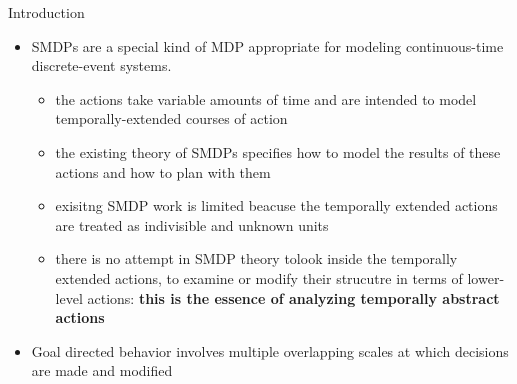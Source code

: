 \begin{frame}{Introduction}
    \begin{itemize}
        \item SMDPs are a special kind of MDP appropriate for modeling continuous-time discrete-event systems.
        \begin{itemize}
            \item the actions take variable amounts of time and are intended to model temporally-extended courses of action
            \item the existing theory of SMDPs specifies how to model the results of these actions and how to plan with them
            \item exisitng SMDP work is limited beacuse the temporally extended actions are treated as indivisible and unknown units
            \item there is no attempt in SMDP theory tolook inside the temporally extended actions, to examine or modify their strucutre in terms of lower-level actions: \textbf{this is the essence of analyzing temporally abstract actions}
        \end{itemize}
        \item Goal directed behavior involves multiple overlapping scales at which decisions are made and modified
    \end{itemize}
\end{frame}

